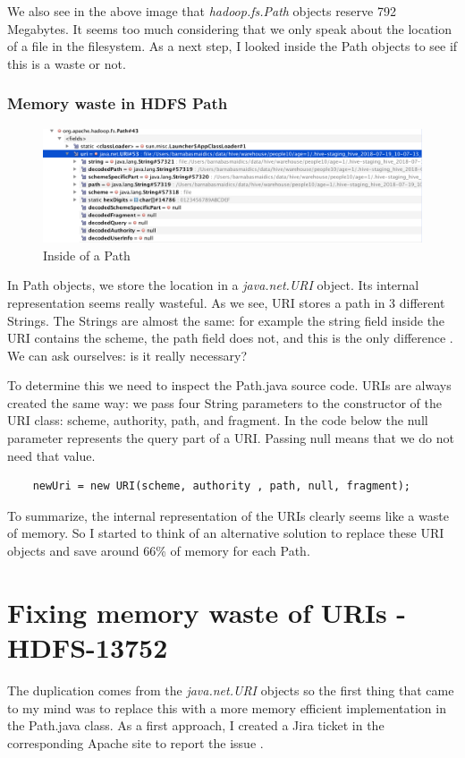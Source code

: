 We also see in the above image that \textit{hadoop.fs.Path} objects reserve 792 Megabytes. It seems too much considering that we only speak about the location of a file in the filesystem. As a next step, I looked inside the Path objects to see if this is a waste or not.

\subsubsection{Memory waste in HDFS Path}
\begin{figure}[H]
	\includegraphics[width=150mm, keepaspectratio]{figures/path_memory.png}
	\centering
	\caption{Inside of a Path}
\end{figure}

In Path objects, we store the location in a \textit{java.net.URI} object. Its internal representation seems really wasteful. As we see, URI stores a path in 3 different Strings. The Strings are almost the same: for example the string field inside the URI contains the scheme, the path field does not, and this is the only difference \etc. We can ask ourselves: is it really necessary?

To determine this we need to inspect the Path.java source code. URIs are always created the same way: we pass four String parameters to the constructor of the URI class: scheme, authority, path, and fragment. In the code below the null parameter represents the query part of a URI. Passing null means that we do not need that value.

\begin{lstlisting}
	newUri = new URI(scheme, authority , path, null, fragment);
\end{lstlisting}

To summarize, the internal representation of the URIs clearly seems like a waste of memory. So I started to think of an alternative solution to replace these URI objects and save around 66\% of memory for each Path. 

\section{Fixing memory waste of URIs - HDFS-13752}
The duplication comes from the \textit{java.net.URI} objects so the first thing that came to my mind was to replace this with a more memory efficient implementation in the Path.java class. As a first approach, I created a Jira ticket in the corresponding Apache site to report the issue \cite{hdfs-path}. 

